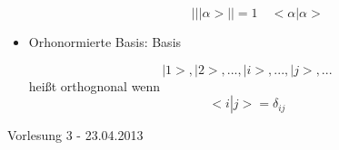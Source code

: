 \documentclass[10pt,article,colorback,accentcolor=tud9d]{scrartcl}
\begin{document}
\begin{itemize}
\begin{itemize}
\begin{fleqn}
\begin{equation}
\left|\right|\left|\right.\alpha>\left|\right| =1 \quad <\alpha\left|\right.\alpha>
\end{equation}
\end{fleqn}
\end{itemize}
\item Orhonormierte Basis: Basis
\begin{fleqn}
\begin{equation} \nonumber
{\left|\right.1>,\left|\right.2>,...,\left|\right.i>,...,\left|\right.j>,...}
\end{equation}
heißt orthognonal wenn
\begin{equation}
<i\left|\right. j>={\delta}_{ij}
\end{equation}
\end{fleqn}
\end{itemize}
Vorlesung 3 - 23.04.2013\\
\end{document}

